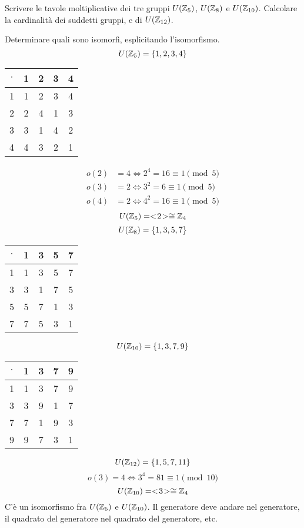 \begin{exmp}
Scrivere le tavole moltiplicative dei tre gruppi $U(\mathbb{Z}_5)$, $U(\mathbb{Z}_8)$ e $U(\mathbb{Z}_{10})$. Calcolare la cardinalit\`a dei suddetti gruppi, e di $U(\mathbb{Z}_{12})$.

Determinare quali sono isomorfi, esplicitando l'isomorfismo.
\[
U(\mathbb{Z}_5) = \{ 1, 2, 3, 4 \}
\]
\begin{center}
\begin{tabular}{c|*{4}{c}}
$\cdot$ & 1 & 2 & 3 & 4 \\
\hline
1 & 1 & 2 & 3 & 4 \\
2 & 2 & 4 & 1 & 3 \\
3 & 3 & 1 & 4 & 2 \\
4 & 4 & 3 & 2 & 1
\end{tabular}
\end{center}
\begin{align*}
o(2) &= 4 \iff 2^4 = 16 \equiv 1 \pmod{5} \\
o(3) &= 2 \iff 3^2 = 6 \equiv 1 \pmod{5} \\
o(4) &= 2 \iff 4^2 = 16 \equiv 1 \pmod{5}
\end{align*}
\[
U(\mathbb{Z}_5) = <\!{2}\!> \cong \mathbb{Z}_4
\]
\[
U(\mathbb{Z}_8) = \{ 1, 3, 5, 7 \}
\]
\begin{center}
\begin{tabular}{c|*{4}{c}}
$\cdot$ & 1 & 3 & 5 & 7 \\
\hline
1 & 1 & 3 & 5 & 7 \\
3 & 3 & 1 & 7 & 5 \\
5 & 5 & 7 & 1 & 3 \\
7 & 7 & 5 & 3 & 1
\end{tabular}
\end{center}
\[
U(\mathbb{Z}_{10}) = \{ 1, 3, 7, 9 \}
\]
\begin{center}
\begin{tabular}{c|*{4}{c}}
$\cdot$ & 1 & 3 & 7 & 9 \\
\hline
1 & 1 & 3 & 7 & 9 \\
3 & 3 & 9 & 1 & 7 \\
7 & 7 & 1 & 9 & 3 \\
9 & 9 & 7 & 3 & 1
\end{tabular}
\end{center}
\[
U(\mathbb{Z}_{12}) = \{ 1, 5, 7, 11 \}
\]
\[
o(3) = 4 \iff 3^4 = 81 \equiv 1 \pmod{10}
\]
\[
U(\mathbb{Z}_{10}) = <\!{3}\!> \cong \mathbb{Z}_4
\]
C'\`e un isomorfismo fra $U(\mathbb{Z}_5)$ e $U(\mathbb{Z}_{10})$. Il generatore deve andare nel generatore, il quadrato del generatore nel quadrato del generatore, etc.


\end{exmp}
